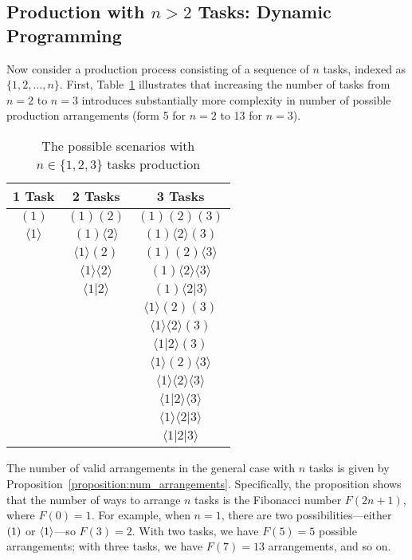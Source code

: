 \documentclass{article}
\theoremstyle{plain}
\theoremstyle{plain}
\begin{document}
\subsection{Production with \(n > 2\) Tasks: Dynamic Programming}
Now consider a production process consisting of a sequence of \(n\) tasks, indexed as \(\{1, 2, \ldots, n\}\).
First, Table~\ref{tab:tree} illustrates that increasing the number of tasks from $n=2$ to $n=3$ introduces substantially more complexity in number of possible production arrangements (form 5 for $n=2$ to 13 for $n=3$).
\begin{table}
  \centering
  \caption{The possible scenarios with \(n \in \{1,2,3\}\) tasks production}
  \label{tab:tree}
  \begin{tabular}{ccc}
  \hline
  1 Task & 2 Tasks & 3 Tasks \\
  \hline
  $(1)$ & $(1)(2)$ & $(1)(2)(3)$ \\
  $\langle 1 \rangle$ & $(1)\langle 2 \rangle$ & $(1)\langle 2\rangle(3)$ \\
   & $\langle 1 \rangle(2)$ & $(1)(2)\langle 3\rangle$ \\
   & $\langle 1 \rangle\langle 2 \rangle$ & $(1)\langle 2\rangle\langle 3\rangle$ \\
   & $\langle 1|2 \rangle$ & $(1)\langle 2|3\rangle$ \\
   & & $\langle 1\rangle(2)(3)$ \\
   & & $\langle 1\rangle\langle 2\rangle(3)$ \\
   & & $\langle 1|2\rangle(3)$ \\
   & & $\langle 1\rangle(2)\langle 3\rangle$ \\
   & & $\langle 1\rangle\langle 2\rangle\langle 3\rangle$ \\
   & & $\langle 1|2\rangle\langle 3\rangle$ \\
   & & $\langle 1\rangle\langle 2|3\rangle$ \\
   & & $\langle 1|2|3\rangle$ \\
  \hline
  \end{tabular}
\end{table}
The number of valid arrangements in the general case with $n$ tasks is given by Proposition~\ref{proposition:num_arrangements}.
Specifically, the proposition shows that the number of ways to arrange \(n\) tasks is the Fibonacci number \(F(2n+1)\), where \(F(0) = 1\).
For example, when \(n=1\), there are two possibilities---either \(( 1 )\) or \(\langle 1 \rangle\)---so \(F(3) = 2\).
With two tasks, we have \(F(5) = 5\) possible arrangements; with three tasks, we have $F(7)=13$ arrangements, and so on.
\end{document}
